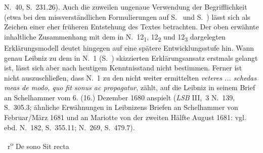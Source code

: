 \begin{ledgroup}
N.~40, S.~231.26\cite{00256}).
Auch die zuweilen ungenaue Verwendung der Begrifflichkeit (etwa bei den missverständlichen Formulierungen %
auf S.~ und S.~) lässt sich als Zeichen einer eher früheren Entstehung des Textes betrachten.
Der oben erwähnte inhaltliche Zusammenhang mit dem in N.~12\textsubscript{1}, 12\textsubscript{2} und 12\textsubscript{3} dargelegten Erklärungsmodell deutet hingegen auf eine spätere Entwicklungsstufe hin.
Wann genau Leibniz zu dem in N.~1 (S.~) skizzierten Erklärungsansatz erstmals gelangt ist, lässt sich aber nach heutigem Kenntnisstand nicht bestimmen.
\pend
\pstart
Ferner ist nicht auszuschließen, dass N.~1 zu den nicht weiter ermittelten \textit{veteres ... schedas meas de modo, quo fit sonus ac propagatur}, zählt, auf die Leibniz in seinem Brief an Schelhammer vom 6. (16.) Dezember 1680 anspielt (\cite{01275}\textit{LSB} III,~3 N.~139, S.~305.3; ähnliche Erwähnungen in Leibnizens Briefen an Schelhammer von Februar/März 1681 und an Mariotte von der zweiten Hälfte August 1681: vgl. ebd. \cite{01194}N.~182, S.~355.11; N.~269, \cite{01193}S.~479.7). 
\pend
\end{ledgroup}
%
 \vspace*{8mm}
%
%
\count{}
\count{}
\count{}
%
%
\pstart%
\normalsize%
\noindent%
~r\textsuperscript{o}\rbrack
\pend%
\pstart%
\centering%
De sono\protect{}
\pend%
\vspace*{0.5em}%
%
\pstart%
\noindent%
Sit recta\protect{}
